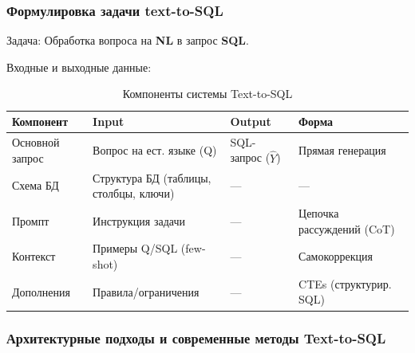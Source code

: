 \subsubsection{Формулировка задачи text-to-SQL}

Задача: Обработка вопроса на \textbf{NL} в запрос \textbf{SQL}.

Входные и выходные данные:

\begin{table}[htbp]
    \centering
    \footnotesize %
    \caption{Компоненты системы Text-to-SQL}
    \begin{tabular}{|p{2.6cm}|p{4.4cm}|p{2.5cm}|p{4cm}|}\hline
    \textbf{Компонент} & \textbf{Input} & \textbf{Output} & \textbf{Форма} \\ \hline
    
    Основной запрос & 
    Вопрос на ест. языке (Q) & 
    SQL-запрос ($\hat{Y}$) & 
    Прямая генерация \\ \hline
    
    Схема БД & 
    Структура БД (таблицы, столбцы, ключи) & 
    — & 
    — \\ \hline
    
    Промпт & 
    Инструкция задачи & 
    — & 
    Цепочка рассуждений (CoT) \\ \hline
    
    Контекст & 
    Примеры Q/SQL (few-shot) & 
    — & 
    Самокоррекция \\ \hline
    
    Дополнения & 
    Правила/ограничения & 
    — & 
    CTEs (структурир. SQL) \\ \hline
    
    \end{tabular}
    \label{tab:sql-components}
\end{table}



\subsubsection{Архитектурные подходы и современные методы Text-to-SQL}

